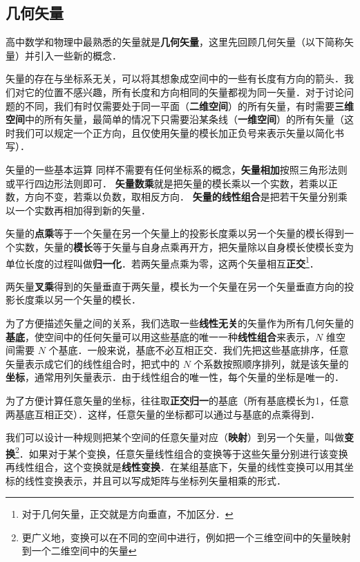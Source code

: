 \subsection{几何矢量}
高中数学和物理中最熟悉的矢量就是\textbf{几何矢量}，这里先回顾几何矢量（以下简称矢量）并引入一些新的概念．

矢量的存在与坐标系无关，可以将其想象成空间中的一些有长度有方向的箭头．我们对它的位置不感兴趣，所有长度和方向相同的矢量都视为同一矢量．对于讨论问题的不同，我们有时仅需要处于同一平面（\textbf{二维空间}）的所有矢量，有时需要\textbf{三维空间}中的所有矢量，最简单的情况下只需要沿某条线（\textbf{一维空间}）的所有矢量（这时我们可以规定一个正方向，且仅使用矢量的模长加正负号来表示矢量以简化书写）．

矢量的一些基本运算 同样不需要有任何坐标系的概念，\textbf{矢量相加}按照三角形法则或平行四边形法则即可．
\textbf{矢量数乘}就是把矢量的模长乘以一个实数，若乘以正数，方向不变，若乘以负数，取相反方向． \textbf{矢量的线性组合}是把若干矢量分别乘以一个实数再相加得到新的矢量．

矢量的\textbf{点乘}等于一个矢量在另一个矢量上的投影长度乘以另一个矢量的模长得到一个实数，矢量的\textbf{模长}等于矢量与自身点乘再开方，把矢量除以自身模长使模长变为单位长度的过程叫做\textbf{归一化}．若两矢量点乘为零，这两个矢量相互\textbf{正交}\footnote{对于几何矢量，正交就是方向垂直，不加区分．}．

两矢量\textbf{叉乘}得到的矢量垂直于两矢量，模长为一个矢量在另一个矢量垂直方向的投影长度乘以另一个矢量的模长．

为了方便描述矢量之间的关系，我们选取一些\textbf{线性无关}的矢量作为所有几何矢量的\textbf{基底}，使空间中的任何矢量可以用这些基底的唯一一种\textbf{线性组合}来表示，$N$ 维空间需要 $N$ 个基底．一般来说，基底不必互相正交．我们先把这些基底排序，任意矢量表示成它们的线性组合时，把式中的 $N$ 个系数按照顺序排列，就是该矢量的\textbf{坐标}，通常用列矢量表示．由于线性组合的唯一性，每个矢量的坐标是唯一的．

为了方便计算任意矢量的坐标，往往取\textbf{正交归一}的基底（所有基底模长为1，任意两基底互相正交）．这样，任意矢量的坐标都可以通过与基底的点乘得到．

我们可以设计一种规则把某个空间的任意矢量对应（\textbf{映射}）到另一个矢量，叫做\textbf{变换}\footnote{更广义地，变换可以在不同的空间中进行，例如把一个三维空间中的矢量映射到一个二维空间中的矢量}．如果对于某个变换，任意矢量线性组合的变换等于这些矢量分别进行该变换再线性组合，这个变换就是\textbf{线性变换}．在某组基底下，矢量的线性变换可以用其坐标的线性变换表示，并且可以写成矩阵与坐标列矢量相乘的形式．%

